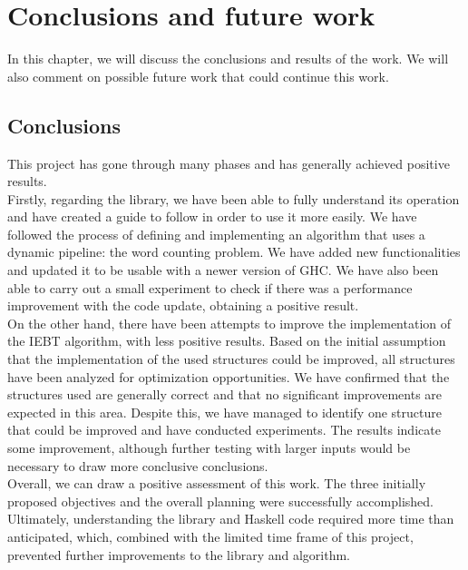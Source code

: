 \chapter{Conclusions and future work}
In this chapter, we will discuss the conclusions and results of the work.
We will also comment on possible future work that could continue this work.
\section{Conclusions}
This project has gone through many phases and has generally achieved positive results. \\

Firstly, regarding the library, we have been able to fully understand its operation and have created a guide to follow in order to use it more easily.
We have followed the process of defining and implementing an algorithm that uses a dynamic pipeline: the word counting problem.
We have added new functionalities and updated it to be usable with a newer version of GHC.
We have also been able to carry out a small experiment to check if there was a performance improvement with the code update, obtaining a positive result. \\

On the other hand, there have been attempts to improve the implementation of the IEBT algorithm, with less positive results.
Based on the initial assumption that the implementation of the used structures could be improved, all structures have been analyzed for optimization opportunities.
We have confirmed that the structures used are generally correct and that no significant improvements are expected in this area.
Despite this, we have managed to identify one structure that could be improved and have conducted experiments.
The results indicate some improvement, although further testing with larger inputs would be necessary to draw more conclusive conclusions. \\

Overall, we can draw a positive assessment of this work.
The three initially proposed objectives and the overall planning were successfully accomplished.
Ultimately, understanding the library and Haskell code required more time than anticipated, which, combined with the limited time frame of this project, prevented further improvements to the library and algorithm.
